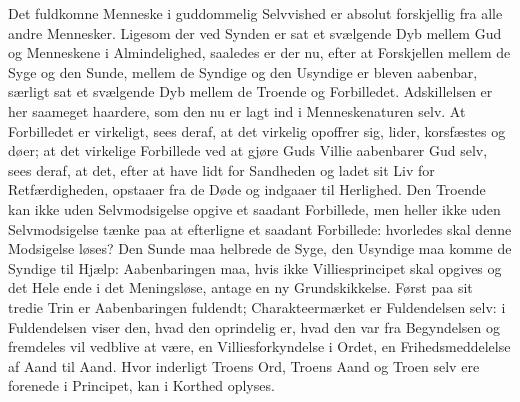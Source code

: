 \documentclass[12pt]{book}
\begin{document}
Det fuldkomne Menneske i guddommelig Selvvished er absolut
forskjellig fra alle andre Mennesker. Ligesom der ved Synden er sat
et svælgende Dyb mellem Gud og Menneskene i Almindelighed, saaledes
er der nu, efter at Forskjellen mellem de Syge og den Sunde, mellem
de Syndige og den Usyndige er bleven aabenbar, særligt sat et
svælgende Dyb mellem de Troende og Forbilledet. Adskillelsen er her
saameget haardere, som den nu er lagt ind i Menneskenaturen selv. At
Forbilledet er virkeligt, sees deraf, at det virkelig opoffrer sig,
lider, korsfæstes og døer; at det virkelige Forbillede ved at gjøre
Guds Villie aabenbarer Gud selv, sees deraf, at det, efter at have
lidt for Sandheden og ladet sit Liv for Retfærdigheden, opstaaer fra
de Døde og indgaaer til Herlighed. Den Troende kan ikke uden
Selvmodsigelse opgive et saadant Forbillede, men heller ikke uden
Selvmodsigelse tænke paa at efterligne et saadant Forbillede:
hvorledes skal denne Modsigelse løses? Den Sunde maa helbrede de
Syge, den Usyndige maa komme de Syndige til Hjælp: Aabenbaringen
maa, hvis ikke Villiesprincipet skal opgives og det Hele ende i det
Meningsløse, antage en ny Grundskikkelse.
Først paa sit tredie Trin er Aabenbaringen fuldendt;
Charakteermærket er Fuldendelsen selv: i Fuldendelsen viser den,
hvad den oprindelig er, hvad den var fra Begyndelsen og fremdeles
vil vedblive at være, en Villiesforkyndelse i Ordet, en
Frihedsmeddelelse af Aand til Aand. Hvor inderligt Troens Ord,
Troens Aand og Troen selv ere forenede i Principet, kan i Korthed
oplyses.
\end{document}
